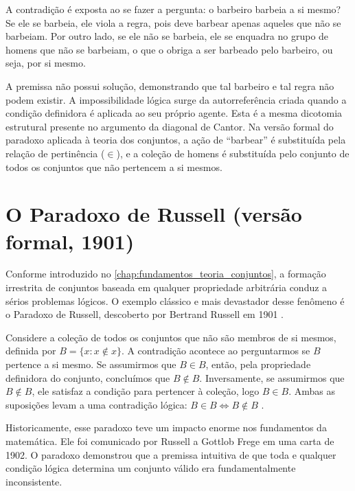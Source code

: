 A contradição é exposta ao se fazer a pergunta: o barbeiro barbeia a si mesmo?
Se ele se barbeia, ele viola a regra, pois deve barbear apenas aqueles que não se barbeiam. Por outro lado, se ele não se barbeia, ele se enquadra no grupo de homens que não se barbeiam, o que o obriga a ser barbeado pelo barbeiro, ou seja, por si mesmo.



A premissa não possui solução, demonstrando que tal barbeiro e tal regra não podem existir. A impossibilidade lógica surge da autorreferência criada quando a condição definidora é aplicada ao seu próprio agente. Esta é a mesma dicotomia estrutural presente no argumento da diagonal de Cantor. Na versão formal do paradoxo aplicada à teoria dos conjuntos, a ação de ``barbear'' é substituída pela relação de pertinência (\(\in\)), e a coleção de homens é substituída pelo conjunto de todos os conjuntos que não pertencem a si mesmos.

\section{O Paradoxo de Russell (versão formal, 1901)}
\label{sec:apendiceRusselFormal}

Conforme introduzido no \autoref{chap:fundamentos_teoria_conjuntos}, a formação irrestrita de conjuntos baseada em qualquer propriedade arbitrária conduz a sérios problemas lógicos. O exemplo clássico e mais devastador desse fenômeno é o Paradoxo de Russell, descoberto por Bertrand Russell em 1901 \cite[p.~15]{enderton1977}.

Considere a coleção de todos os conjuntos que não são membros de si mesmos, definida por \( B = \{x : x \notin x\} \). A contradição acontece ao perguntarmos se \( B \) pertence a si mesmo. Se assumirmos que \( B \in B \), então, pela propriedade definidora do conjunto, concluímos que \( B \notin B \). Inversamente, se assumirmos que \( B \notin B \), ele satisfaz a condição para pertencer à coleção, logo \( B \in B \). Ambas as suposições levam a uma contradição lógica: \( B \in B \Leftrightarrow B \notin B \) \cite[p.~6]{enderton1977}.

Historicamente, esse paradoxo teve um impacto enorme nos fundamentos da matemática. Ele foi comunicado por Russell a Gottlob Frege em uma carta de 1902. O paradoxo demonstrou que a premissa intuitiva de que toda e qualquer condição lógica determina um conjunto válido era fundamentalmente inconsistente.


